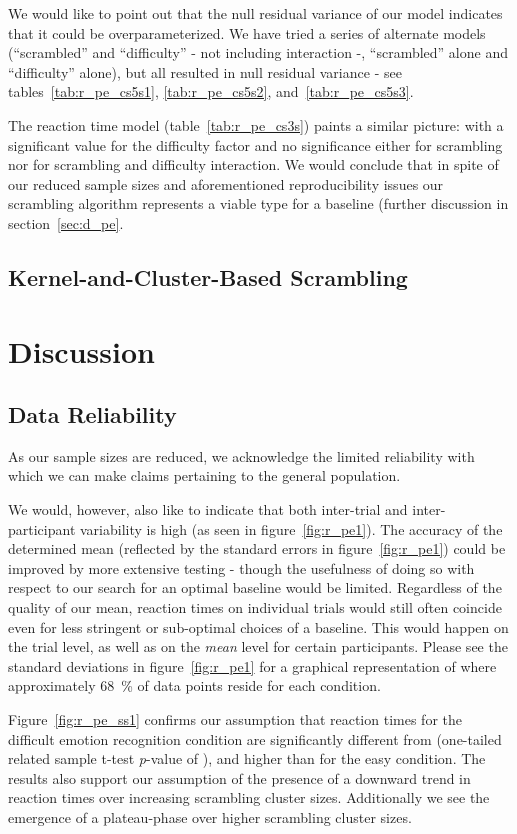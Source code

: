 	    We would like to point out that the null residual variance of our model indicates that it could be overparameterized.
	    We have tried a series of alternate models (“scrambled” and “difficulty” - not including interaction -, “scrambled” alone and “difficulty” alone), but all resulted in null residual variance - 
	    see tables~\ref{tab:r_pe_cs5s1}, \ref{tab:r_pe_cs5s2}, and~\ref{tab:r_pe_cs5s3}.
	    
	    The reaction time model (table~\ref{tab:r_pe_cs3s}) paints a similar picture: with a significant value for the difficulty factor and no significance either for scrambling nor for scrambling and difficulty interaction.
	    We would conclude that in spite of our reduced sample sizes and aforementioned reproducibility issues our scrambling algorithm represents a viable type for a baseline (further discussion in section~\ref{sec:d_pe}.
	\subsection{Kernel-and-Cluster-Based Scrambling}
    \section{Discussion}\label{sec:pe_d}
	\subsection{Data Reliability}
	    As our sample sizes are reduced, we acknowledge the limited reliability with which we can make claims pertaining to the general population. 
	
	    We would, however, also like to indicate that both inter-trial and inter-participant variability is high (as seen in figure~\ref{fig:r_pe1}).
	    The accuracy of the determined mean (reflected by the standard errors in figure~\ref{fig:r_pe1}) could be improved by more extensive testing - though the usefulness of doing so with respect to our search for an optimal baseline would be limited.
	    Regardless of the quality of our mean, reaction times on individual trials would still often coincide even for less stringent or sub-optimal choices of a baseline.  
	    This would happen on the trial level, as well as on the \textit{mean} level for certain participants.
	    Please see the standard deviations in figure~\ref{fig:r_pe1} for a graphical representation of where approximately \SI{68}{\percent} of data points reside for each condition.
	    
	    
	    Figure~\ref{fig:r_pe_ss1} confirms our assumption that reaction times for the difficult emotion recognition condition are significantly different from (one-tailed related sample t-test \textit{p}-value of 
	    ),
	    and higher than for the easy condition.
	    The results also support our assumption of the presence of a downward trend in reaction times over increasing scrambling cluster sizes.
	    Additionally we see the emergence of a plateau-phase over higher scrambling cluster sizes.
	    
